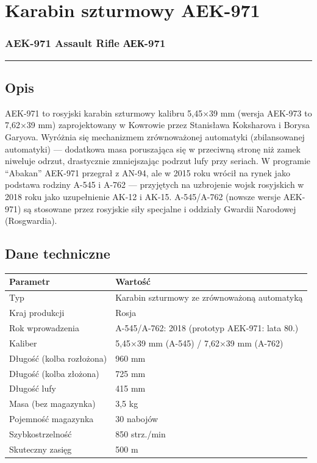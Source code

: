 \documentclass[12pt,openany,oneside]{book}
\begin{document}
\chapter{Karabin szturmowy AEK-971}\label{karabin-szturmowy-aek-971}

\subsection{AEK-971 Assault Rifle \textbar{}
АЕК-971}\label{aek-971-assault-rifle-ux430ux435ux43a-971}

\begin{center}\rule{0.5\linewidth}{0.5pt}\end{center}

\section{Opis}\label{opis-51}

AEK-971 to rosyjski karabin szturmowy kalibru 5,45×39 mm (wersja AEK-973
to 7,62×39 mm) zaprojektowany w Kowrowie przez Stanisława Koksharova i
Borysa Garyova. Wyróżnia się mechanizmem zrównoważonej automatyki
(zbilansowanej automatyki) --- dodatkowa masa poruszająca się w
przeciwną stronę niż zamek niweluje odrzut, drastycznie zmniejszając
podrzut lufy przy seriach. W programie ``Abakan'' AEK-971 przegrał z
AN-94, ale w 2015 roku wrócił na rynek jako podstawa rodziny A-545 i
A-762 --- przyjętych na uzbrojenie wojsk rosyjskich w 2018 roku jako
uzupełnienie AK-12 i AK-15. A-545/A-762 (nowsze wersje AEK-971) są
stosowane przez rosyjskie siły specjalne i oddziały Gwardii Narodowej
(Rosgwardia).

\section{Dane techniczne}\label{dane-techniczne-51}

\begin{longtable}[]{@{}ll@{}}
\toprule\noalign{}
Parametr & Wartość \\
\midrule\noalign{}
\endhead
\bottomrule\noalign{}
\endlastfoot
Typ & Karabin szturmowy ze zrównoważoną automatyką \\
Kraj produkcji & Rosja \\
Rok wprowadzenia & A-545/A-762: 2018 (prototyp AEK-971: lata 80.) \\
Kaliber & 5,45×39 mm (A-545) / 7,62×39 mm (A-762) \\
Długość (kolba rozłożona) & 960 mm \\
Długość (kolba złożona) & 725 mm \\
Długość lufy & 415 mm \\
Masa (bez magazynka) & 3,5 kg \\
Pojemność magazynka & 30 nabojów \\
Szybkostrzelność & 850 strz./min \\
Skuteczny zasięg & 500 m \\
\end{longtable}
\end{document}
